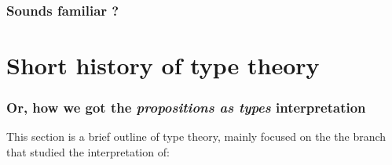 \documentclass{beamer}
\begin{document}
\begin{frame}

    \frametitle{Sounds familiar ?}

    \begin{itemize}
    
    
    
    
    \end{itemize}


\end{frame}


\section{Short history of type theory} %
\label{sec:Short history of type theory}

\begin{frame}

    \frametitle{Or, how we got the \textit{propositions as types}
    interpretation}

    This section is a brief outline of type theory, mainly focused on
    the the branch that studied the interpretation of:

    \begin{itemize}
    
    
    


    \end{itemize}

\end{frame}
\end{document}
